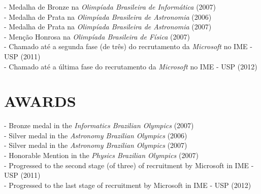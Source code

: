 \documentclass[]{res} %
\def \divspace{6pt}
\begin{document}
\begin{resume}
    - Medalha de Bronze na {\sl Olimpíada Brasileira de Informática} (2007) \\
    - Medalha de Prata na {\sl Olimpíada Brasileira de Astronomia} (2006) \\
    - Medalha de Prata na {\sl Olimpíada Brasileira de Astronomia} (2007) \\
    - Menção Honrosa na {\sl Olimpíada Brasileira de Física} (2007) \\
    - Chamado até a segunda fase (de três) do recrutamento da {\sl Microsoft} no IME - USP (2011) \\
    - Chamado até a última fase do recrutamento da {\sl Microsoft} no IME - USP (2012)
\else
    \section{AWARDS \hspace{\divspace} }

    - Bronze medal in the {\sl Informatics Brazilian Olympics} (2007) \\
    - Silver medal in the {\sl Astronomy Brazilian Olympics} (2006) \\
    - Silver medal in the {\sl Astronomy Brazilian Olympics} (2007) \\
    - Honorable Mention in the {\sl Physics Brazilian Olympics} (2007) \\
    - Progressed to the second stage (of three) of recruitment by Microsoft in IME - USP (2011) \\
    - Progressed to the last stage of recruitment by Microsoft in IME - USP (2012)
\fi

\end{resume}
\end{document}
